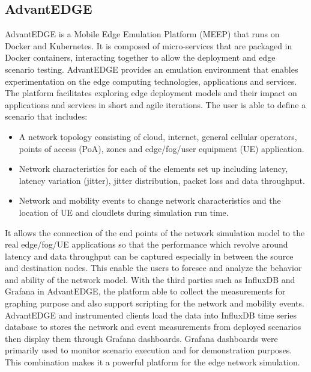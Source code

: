 \subsection{AdvantEDGE}
AdvantEDGE is a Mobile Edge Emulation Platform (MEEP) that runs on Docker and Kubernetes. It is composed of micro-services that are packaged in Docker containers, interacting together to allow the deployment and edge scenario testing. AdvantEDGE provides an emulation environment that enables experimentation on the edge computing technologies, applications and services. The platform facilitates exploring edge deployment models and their impact on applications and services in short and agile iterations. The user is able to define a scenario that includes:
\begin{itemize}
    \item A network topology consisting of cloud, internet, general cellular operators, points of access (PoA), zones and edge/fog/user equipment (UE) application.
    \item Network characteristics for each of the elements set up including latency, latency variation (jitter), jitter distribution, packet loss and data throughput.
    \item Network and mobility events to change network characteristics and the location of UE and cloudlets during simulation run time. 
\end{itemize}

It allows the connection of the end points of the network simulation model to the real edge/fog/UE applications so that the performance which revolve around latency and data throughput can be captured especially in between the source and destination nodes. This enable the users to foresee and analyze the behavior and ability of the network model. With the third parties such as InfluxDB and Grafana in AdvantEDGE, the platform able to collect the measurements for graphing purpose and also support scripting for the network and mobility events. AdvantEDGE and instrumented clients load the data into InfluxDB time series database to stores the network and event measurements from deployed scenarios then display them through Grafana dashboards. Grafana dashboards were primarily used to monitor scenario execution and for demonstration purposes. This combination makes it a powerful platform for the edge network simulation.

